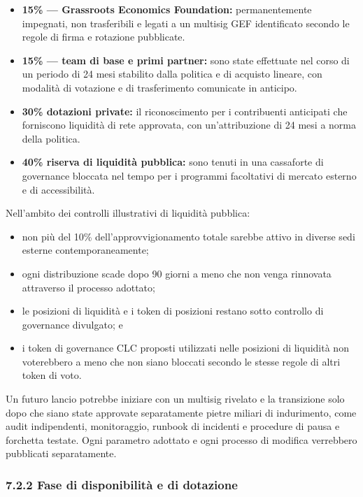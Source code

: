 \documentclass[11pt]{article}
\begin{document}
\begin{itemize}[leftmargin=*]
\item \textbf{15\% --- Grassroots Economics Foundation:} permanentemente impegnati, non trasferibili e legati a un multisig GEF identificato secondo le regole di firma e rotazione pubblicate.
\item \textbf{15\% --- team di base e primi partner:} sono state effettuate nel corso di un periodo di 24 mesi stabilito dalla politica e di acquisto lineare, con modalità di votazione e di trasferimento comunicate in anticipo.
\item \textbf{30\%  dotazioni private:} il riconoscimento per i contribuenti anticipati che forniscono liquidità di rete approvata, con un'attribuzione di 24 mesi a norma della politica.
\item \textbf{40\%  riserva di liquidità pubblica:} sono tenuti in una cassaforte di governance bloccata nel tempo per i programmi facoltativi di mercato esterno e di accessibilità.
\end{itemize}
Nell'ambito dei controlli illustrativi di liquidità pubblica:

\begin{itemize}[leftmargin=*]
\item non più del 10\% dell'approvvigionamento totale sarebbe attivo in diverse sedi esterne contemporaneamente;
\item ogni distribuzione scade dopo 90 giorni a meno che non venga rinnovata attraverso il processo adottato;
\item le posizioni di liquidità e i token di posizioni restano sotto controllo di governance divulgato; e
\item i token di governance CLC proposti utilizzati nelle posizioni di liquidità non voterebbero a meno che non siano bloccati secondo le stesse regole di altri token di voto.
\end{itemize}
Un futuro lancio potrebbe iniziare con un multisig rivelato e la transizione solo dopo che siano state approvate separatamente pietre miliari di indurimento, come audit indipendenti, monitoraggio, runbook di incidenti e procedure di pausa e forchetta testate. Ogni parametro adottato e ogni processo di modifica verrebbero pubblicati separatamente.

\subsubsection*{7.2.2 Fase di disponibilità e di dotazione}
\end{document}

